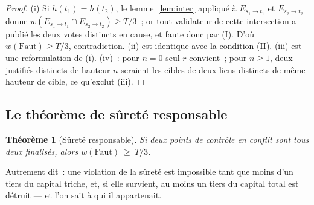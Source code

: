 \documentclass[11pt,a4paper]{article}
\theoremstyle{plain}
\newtheorem{theoreme}{Théorème}
\theoremstyle{definition}
\begin{document}
\begin{proof}
(i) Si $h(t_1)=h(t_2)$, le lemme~\ref{lem:inter} appliqué à $E_{s_1\to t_1}$ et
$E_{s_2\to t_2}$ donne $w(E_{s_1\to t_1}\cap E_{s_2\to t_2})\ge T/3$~; or tout validateur de
cette intersection a publié les deux votes distincts en cause, et faute donc par (I). D'où
$w(\mathrm{Faut})\ge T/3$, contradiction. (ii) est identique avec la condition (II). (iii) est une
reformulation de (i). (iv)~: pour $n=0$ seul $r$ convient~; pour $n\ge1$, deux justifiés
distincts de hauteur $n$ seraient les cibles de deux liens distincts de même hauteur de
cible, ce qu'exclut (iii).
\end{proof}

\subsection{Le théorème de sûreté responsable}

\begin{theoreme}[Sûreté responsable]\label{th:safety}
Si deux points de contrôle en conflit sont tous deux finalisés, alors
$w(\mathrm{Faut})\ \ge\ T/3$.
\end{theoreme}

Autrement dit~: une violation de la sûreté est impossible tant que moins d'un tiers du
capital triche, et, si elle survient, au moins un tiers du capital total est détruit — et l'on
sait à qui il appartenait.
\end{document}

